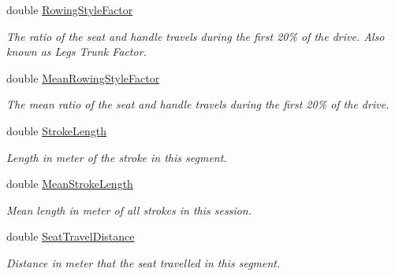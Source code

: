 \begin{DoxyCompactItemize}
double \hyperlink{struct_rowing_monitor_1_1_model_1_1_util_1_1_rowing_meta_data_aef2308b378aa333bfc56ab06b9379728}{Rowing\+Style\+Factor}
\begin{DoxyCompactList}\small\item\em The ratio of the seat and handle travels during the first 20\% of the drive. Also known as Legs Trunk Factor. \end{DoxyCompactList}\item 
double \hyperlink{struct_rowing_monitor_1_1_model_1_1_util_1_1_rowing_meta_data_accb0b7482873df604c048f9b6b3e7cda}{Mean\+Rowing\+Style\+Factor}
\begin{DoxyCompactList}\small\item\em The mean ratio of the seat and handle travels during the first 20\% of the drive. \end{DoxyCompactList}\item 
double \hyperlink{struct_rowing_monitor_1_1_model_1_1_util_1_1_rowing_meta_data_a8ac52168564edafe178adb9ee25656e8}{Stroke\+Length}
\begin{DoxyCompactList}\small\item\em Length in meter of the stroke in this segment. \end{DoxyCompactList}\item 
double \hyperlink{struct_rowing_monitor_1_1_model_1_1_util_1_1_rowing_meta_data_a80c9a6c9f230a1f7a84c8ed3e1f3353b}{Mean\+Stroke\+Length}
\begin{DoxyCompactList}\small\item\em Mean length in meter of all strokes in this session. \end{DoxyCompactList}\item 
double \hyperlink{struct_rowing_monitor_1_1_model_1_1_util_1_1_rowing_meta_data_aee2b36d9b2b283dc8a0231c745b4e6e8}{Seat\+Travel\+Distance}
\begin{DoxyCompactList}\small\item\em Distance in meter that the seat travelled in this segment. \end{DoxyCompactList}\item 

\end{DoxyCompactItemize}

